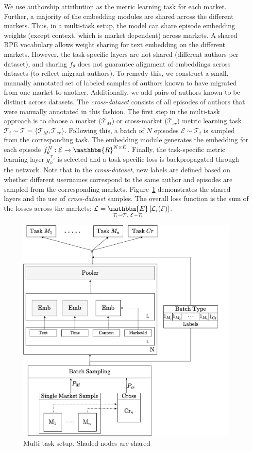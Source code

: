We use authorship attribution as the metric learning task for each market.
Further, a majority of the embedding modules are shared across the different markets.
Thus, in a multi-task setup, the model can share episode embedding weights (except context, which is market dependent) across markets. 
A shared BPE vocabulary allows weight sharing for text embedding on the different markets. 
However, the task-specific layers are not shared (different authors per dataset), and sharing $f_\theta$ does not guarantee alignment of embeddings across datasets (to reflect migrant authors). 
To remedy this, we construct a small, manually annotated set of labeled samples of authors known to have migrated from one market to another.
Additionally, we add pairs of authors known to be distinct across datasets.
The \textit{cross-dataset} consists of all episodes of authors that were manually annotated in this fashion.
The first step in the multi-task approach is to choose a market {($\mathcal{T}_M$)} or cross-market {($\mathcal{T}_{cr}$)} metric learning task $\mathcal{T}_i \sim \mathcal{T} =  \{\mathcal{T}_M, \mathcal{T}_{cr} \}$.
Following this, a batch of $N$ episodes $\mathcal{E} \sim \mathcal{T}_i$ is sampled from the corresponding task.
The embedding module generates the embedding for each episode $f_{\theta}^N: \mathcal{E} \xrightarrow[]{} \mathbbm{R}^{N \times E}$. 
Finally, the task-specific metric learning layer $g_{\phi}^{\mathcal{T}_i}$ is selected and a task-specific loss is backpropagated through the network. 
Note that in the \textit{cross-dataset}, new labels are defined based on whether different usernames correspond to the same author and episodes are sampled from the corresponding markets. 
Figure~\ref{fig:multitask_setup} demonstrates the shared layers and the use of \textit{cross-dataset} samples. 
The overall loss function is the sum of the losses across the markets: $\mathcal{L} = \underset{\mathcal{T}_i \sim \mathcal{T},\ \mathcal{E} \sim \mathcal{T}_i}{\mathbbm{E}}\left[\mathcal{L}_i(\mathcal{E})\right] $.
\begin{figure}
    \centering
    \includegraphics[width=0.8\linewidth]{sysml/figures/MultiTask.pdf}
    \caption{Multi-task setup. Shaded nodes are shared}
    \label{fig:multitask_setup}
\end{figure}
